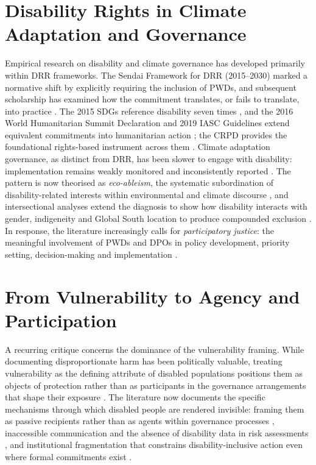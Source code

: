 \documentclass[12pt,a4paper]{report}
\begin{document}
\section{Disability Rights in Climate Adaptation and Governance}
Empirical research on disability and climate governance has developed primarily within DRR frameworks. The Sendai Framework for DRR (2015--2030) marked a normative shift by explicitly requiring the inclusion of PWDs, and subsequent scholarship has examined how the commitment translates, or fails to translate, into practice \cite{Spurway2016,Lord2025}. The 2015 SDGs reference disability seven times \cite{UNSDGLeaveNoOneBehind}, and the 2016 World Humanitarian Summit Declaration and 2019 IASC Guidelines extend equivalent commitments into humanitarian action \cite{Watts2021LancetCountdown,IASC2019DisabilitiesHumanitarianAction}; the CRPD provides the foundational rights-based instrument across them \cite{UN2006CRPD}. Climate adaptation governance, as distinct from DRR, has been slower to engage with disability: implementation remains weakly monitored and inconsistently reported \cite{Kim2024,Jodoin2020}. The pattern is now theorised as \textit{eco-ableism}, the systematic subordination of disability-related interests within environmental and climate discourse \cite{Harpur2025}, and intersectional analyses extend the diagnosis to show how disability interacts with gender, indigeneity and Global South location to produce compounded exclusion \cite{Murcott2025,Parker2025}. In response, the literature increasingly calls for \textit{participatory justice}: the meaningful involvement of PWDs and DPOs in policy development, priority setting, decision-making and implementation \cite{Polack2008}.

\section{From Vulnerability to Agency and Participation}
A recurring critique concerns the dominance of the vulnerability framing. While documenting disproportionate harm has been politically valuable, treating vulnerability as the defining attribute of disabled populations positions them as objects of protection rather than as participants in the governance arrangements that shape their exposure \cite{stein2022disability,Chukwudum2025}. The literature now documents the specific mechanisms through which disabled people are rendered invisible: framing them as passive recipients rather than as agents within governance processes \cite{Ton2019}, inaccessible communication and the absence of disability data in risk assessments \cite{Grech2025,TannenbaumBaruchi2024}, and institutional fragmentation that constrains disability-inclusive action even where formal commitments exist \cite{Pertiwi2022}.
\end{document}
